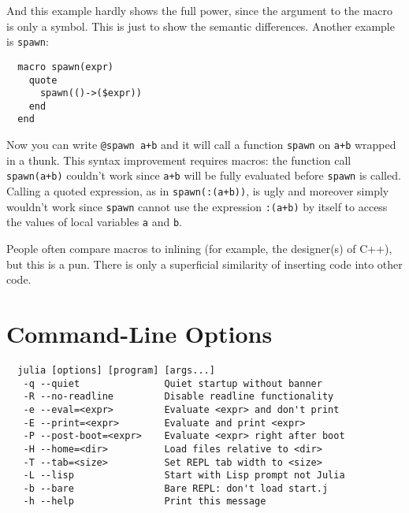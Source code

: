 \documentclass{article}
\renewcommand{\sec}[1]{\label{sec:#1}}
\begin{document}
And this example hardly shows the full power, since the argument to
the macro is only a symbol.
This is just to show the semantic differences.
Another example is \verb|spawn|:

\begin{verbatim}
  macro spawn(expr)
    quote
      spawn(()->($expr))
    end
  end
\end{verbatim}

Now you can write \verb|@spawn a+b| and it will call a function \verb|spawn| on \verb|a+b| wrapped in a thunk.
This syntax improvement requires macros:
the function call \verb|spawn(a+b)| couldn't work since \verb|a+b| will be fully evaluated before \verb|spawn| is called.
Calling a quoted expression, as in \verb|spawn(:(a+b))|, is ugly and moreover simply wouldn't work since \verb|spawn| cannot use the expression \verb|:(a+b)| by itself to access the values of local variables \verb|a| and \verb|b|.

People often compare macros to inlining (for example, the designer(s) of C++), but this is a pun.
There is only a superficial similarity of inserting code into other code.

\section{Command-Line Options}
\sec{command-line-options}

\begin{verbatim}
  julia [options] [program] [args...]
   -q --quiet               Quiet startup without banner
   -R --no-readline         Disable readline functionality
   -e --eval=<expr>         Evaluate <expr> and don't print
   -E --print=<expr>        Evaluate and print <expr>
   -P --post-boot=<expr>    Evaluate <expr> right after boot
   -H --home=<dir>          Load files relative to <dir>
   -T --tab=<size>          Set REPL tab width to <size>
   -L --lisp                Start with Lisp prompt not Julia
   -b --bare                Bare REPL: don't load start.j
   -h --help                Print this message
\end{verbatim}
\end{document}
